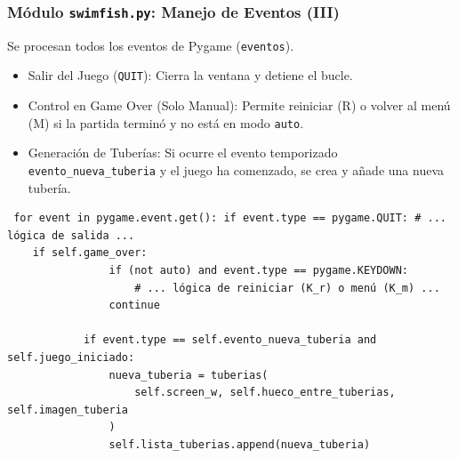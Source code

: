 \documentclass[
	11pt, %
]{beamer}
\begin{document}
\begin{frame}[fragile] \frametitle{Módulo \texttt{swimfish.py}: Manejo de Eventos (III)}

Se procesan todos los eventos de Pygame (\texttt{eventos}).

\begin{itemize} \item Salir del Juego (\texttt{QUIT}): Cierra la ventana y detiene el bucle. \item Control en Game Over (Solo Manual): Permite reiniciar (R) o volver al menú (M) si la partida terminó y no está en modo \texttt{auto}. \item Generación de Tuberías: Si ocurre el evento temporizado \texttt{evento_nueva_tuberia} y el juego ha comenzado, se crea y añade una nueva tubería. \end{itemize}

\vspace{4pt} {\scriptsize \begin{verbatim} for event in pygame.event.get(): if event.type == pygame.QUIT: # ... lógica de salida ...
    if self.game_over:
                if (not auto) and event.type == pygame.KEYDOWN:
                    # ... lógica de reiniciar (K_r) o menú (K_m) ...
                continue

            if event.type == self.evento_nueva_tuberia and self.juego_iniciado:
                nueva_tuberia = tuberias(
                    self.screen_w, self.hueco_entre_tuberias, self.imagen_tuberia
                )
                self.lista_tuberias.append(nueva_tuberia)
\end{verbatim} } \end{frame}

\end{document}
